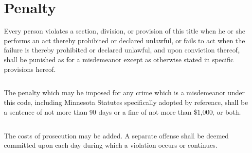 \section{Penalty}
Every person violates a section, division, or provision of this title when he or she performs an act thereby prohibited or declared unlawful, or fails to act when the failure is thereby prohibited or declared unlawful, and upon conviction thereof, shall be punished as for a misdemeanor except as otherwise stated in specific provisions hereof.
\subsection{}
The penalty which may be imposed for any crime which is a misdemeanor under this code, including Minnesota Statutes specifically adopted by reference, shall be a sentence of not more than 90 days or a fine of not more than \$1,000, or both.
\subsection{}
The costs of prosecution may be added.  A separate offense shall be deemed committed upon each day during which a violation occurs or continues.
